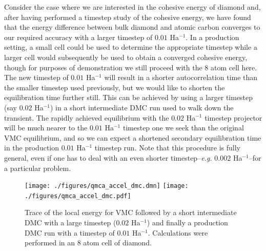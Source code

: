 Consider the case where we are interested in the cohesive energy of 
diamond and, after having performed a timestep study of the cohesive 
energy, we have found that the energy difference between bulk diamond 
and atomic carbon converges to our required accuracy with a larger 
timestep of $0.01$ Ha$^{-1}$.  In a production setting, a small cell 
could be used to determine  the appropriate timestep while a larger 
cell would subsequently be used to obtain a converged cohesive energy, 
though for purposes of demonstration we still proceed with the 8 atom 
cell here.  The new timestep of $0.01$ Ha$^{-1}$ will result in a shorter 
autocorrelation time than the smaller timestep used previously, but 
we would like to shorten the equilibration time further still.  This 
can be achieved by using a larger timestep (say $0.02$ Ha$^{-1}$) in a 
short intermediate DMC run used to walk down the transient.  The 
rapidly achieved equilibrium with the $0.02$ Ha$^{-1}$ timestep 
projector will be much nearer to the $0.01$ Ha$^{-1}$ timestep one 
we seek than the original VMC equilibrium, and so we can expect 
a shortened secondary equilibration time in the production 
$0.01$ Ha$^{-1}$ timestep run. Note that this procedure is fully 
general, even if one has to deal with an even shorter 
timestep--\emph{e.g.} $0.002$ Ha$^{-1}$--for a particular problem.

\begin{figure}
\begin{center}
\ifdefined\HCode  
\texttt{[image: ./figures/qmca\_accel\_dmc.dmn]}
\else
\texttt{[image: ./figures/qmca\_accel\_dmc.pdf]}
\fi
\end{center}
\caption{Trace of the local energy for VMC followed by a short intermediate DMC with a large timestep ($0.02$ Ha$^{-1}$) and finally a production DMC run with a timestep of $0.01$ Ha$^{-1}$.  Calculations were performed in an 8 atom cell of diamond.} 
\label{fig:qmca_accel_dmc}
\end{figure}

